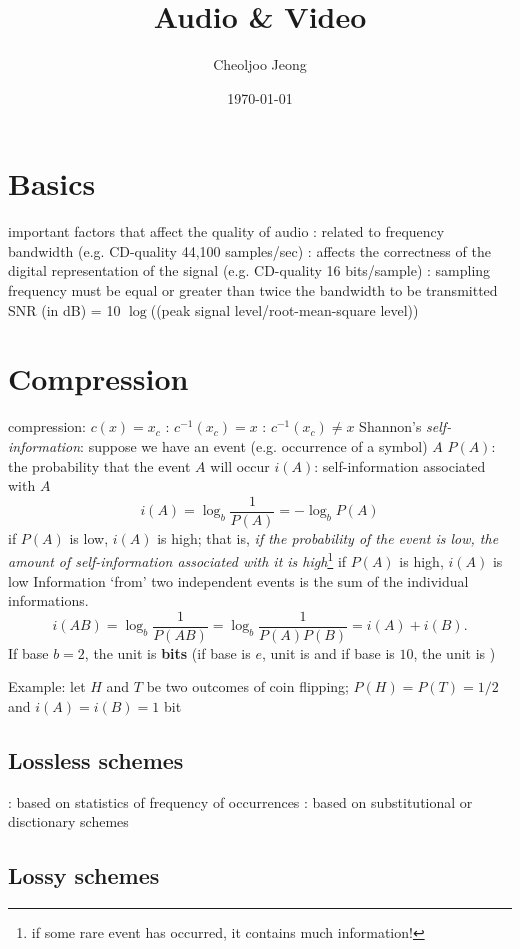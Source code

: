 \documentclass{myart}
\begin{document}
\small

\title{\Large\bf{}Audio \& Video}
\author{\normalsize{}Cheoljoo Jeong}
\date{\normalsize\today}
\maketitle

\section{Basics}
\bit
\w important factors that affect the quality of audio
	\bit
	\w {}: related to frequency bandwidth
		(e.g. CD-quality 44,100 samples/sec)
	\w {}:
		affects the correctness of the digital representation
		of the signal
		(e.g. CD-quality 16 bits/sample)
	\eit
\w {}: sampling frequency must be 
	equal or greater than twice the bandwidth to be transmitted
\w SNR (in dB) = 10 $\log$((peak signal level/root-mean-square level))
\eit

\section{Compression}
\bit
\w compression: $c(x) = x_c$
\w {}: $c^{-1}(x_c) = x$
\w {}: $c^{-1}(x_c) \not= x$
\w Shannon's {\em self-information\/}:
	\bit
	\w suppose we have an event (e.g. occurrence of a symbol) $A$
	\w $P(A)$: the probability that the event $A$ will occur
	\w $i(A)$: self-information associated with $A$
		\[ i(A) = \log_b\frac{1}{P(A)} = -\log_bP(A)\]
	\w if $P(A)$ is low, $i(A)$ is high; that is, {\em if the probability
	of the event is low, the amount of self-information associated with
	it is high\/}\footnote{if some rare event has occurred, it contains 
	much information! }
	\w if $P(A)$ is high, $i(A)$ is low
	\eit
\w Information `from' two independent events is the sum of the
	individual informations.
   \[ i(AB) = \log_b\frac{1}{P(AB)} = \log_b\frac{1}{P(A)P(B)}
	= i(A) + i(B).\]
\w If base $b = 2$, the unit is {\bf bits\/} (if base is $e$, unit is 
	and if base is $10$, the unit is )
	
\w Example: let $H$ and $T$ be two outcomes of coin flipping;
	$P(H) = P(T) = 1/2$ and $i(A) = i(B) = 1$ bit
\eit

\subsection{Lossless schemes}
\bit
\w {}
\w {}: based on statistics of frequency of occurrences
\w {}: based on substitutional or
	disctionary schemes
\eit
\subsection{Lossy schemes}
\bit
\w 
\eit
\end{document}
